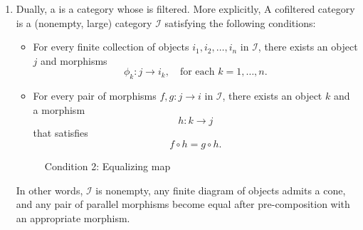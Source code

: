 \begin{definition}
\begin{enumerate}
    \item Dually, a  is a category whose  is filtered. More explicitly, A cofiltered category is a (nonempty, large) category $\mathcal{I}$ satisfying the following conditions:

    \begin{itemize}
        \item For every finite collection of objects $i_1, i_2, \ldots, i_n$ in $\mathcal{I}$, there exists an object $j$ and morphisms
        \[
        \phi_k: j \to i_k, \quad \text{for each } k=1, \ldots, n.
        \]

        \item For every pair of morphisms $f,g: j \to i$ in $\mathcal{I}$, there exists an object $k$ and a morphism 
        \[
        h: k \to j
        \] 
        that satisfies
        \[
        f \circ h = g \circ h.
        \]
    \end{itemize}

    \begin{figure}[h]
        \centering
        \begin{minipage}{0.45\textwidth}
            \centering
            \caption*{Condition 1: Lower Bound}
        \end{minipage}
        \hfill
        \begin{minipage}{0.45\textwidth}
            \centering
            \caption*{Condition 2: Equalizing map}
        \end{minipage}
    \end{figure}

    In other words, $\mathcal{I}$ is nonempty, any finite diagram of objects admits a cone, and any pair of parallel morphisms become equal after pre-composition with an appropriate morphism.

    \end{enumerate}

    
\end{definition}
